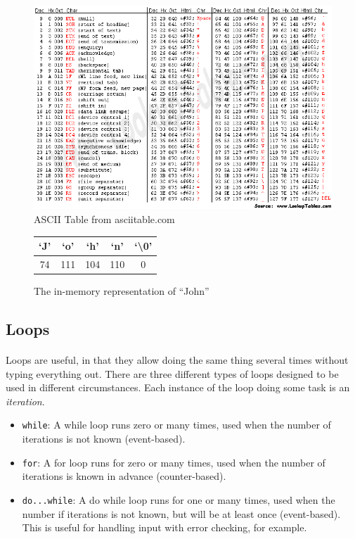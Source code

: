 \documentclass[letter,11pt]{article}
\begin{document}
\begin{figure}[h!]
    \includegraphics[scale=0.72]{FinalExam/asciifull.png}
    \caption{ASCII Table from asciitable.com}
    \label{fig:asciitable}
\end{figure}

\begin{figure}[h!]
    \centering
    \begin{tabular}{|c|c|c|c|c|}
        \hline
        `J' & `o' & `h' & `n' & `\textbackslash0' \\
        \hline
        74 & 111 & 104 & 110 & 0 \\
        \hline
    \end{tabular}
    \caption{The in-memory representation of ``John''}
    \label{fig:stringjohn}
\end{figure}

\FloatBarrier
\subsection{Loops}
\paragraph{}Loops are useful, in that they allow doing the same thing several times without typing everything out. There are three different types of loops designed to be used in different circumstances. Each instance of the loop doing some task is an \textit{iteration}.
\begin{itemize}
    \item \texttt{while}: A while loop runs zero or many times, used when the number of iterations is not known (event-based).
    \item \texttt{for}: A for loop runs for zero or many times, used when the number of iterations is known in advance (counter-based).
    \item \texttt{do...while}: A do while loop runs for one or many times, used when the number if iterations is not known, but will be at least once (event-based). This is useful for handling input with error checking, for example.
\end{itemize}
\end{document}
